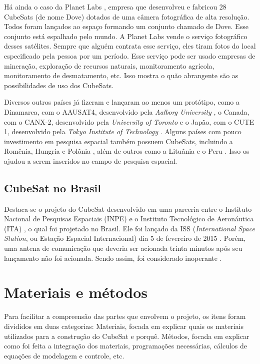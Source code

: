 \documentclass[
	12pt,				%
	openany,			%
	twoside,			%
	a4paper,			%
	english,			%
	french,				%
	spanish,			%
	brazil,				%
	oldfontcommands
	]{abntex2}
\begin{document}
Há ainda o caso da Planet Labs \cite{PlanetLabs}, empresa que desenvolveu e fabricou 28 CubeSats (de nome Dove) dotados de uma câmera fotográfica de alta resolução. Todos foram lançados ao espaço formando um conjunto chamado de Dove. Esse conjunto está espalhado pelo mundo. A Planet Labs vende o serviço fotográfico desses satélites. Sempre que alguém contrata esse serviço, eles tiram fotos do local especificado pela pessoa por um período. Esse serviço pode ser usado empresas de mineração, exploração de recursos naturais, monitoramento agrícola, monitoramento de desmatamento, etc. Isso mostra o quão abrangente são as possibilidades de uso dos CubeSats.

Diversos outros países já fizeram e lançaram ao menos um protótipo, como a Dinamarca, com o AAUSAT4, desenvolvido pela \textit{Aalborg University} \cite{AAUSAT}, o Canada, com o CANX-2, desenvolvido pela \textit{University of Toronto} \cite{CANX} e o Japão, com o CUTE 1, desenvolvido pela \textit{Tokyo Institute of Technology} \cite{CUTE}. Alguns países com pouco investimento em pesquisa espacial também possuem CubeSats, incluindo a Romênia, Hungria e Polônia \cite{ESA}, além de outros como a Lituânia e o Peru \cite{SpaceNews}. Isso os ajudou a serem inseridos no campo de pesquisa espacial.

\section[CubeSat no Brasil]{CubeSat no Brasil}

Destaca-se o projeto do CubeSat desenvolvido em uma parceria entre o Instituto Nacional de Pesquisas Espaciais (INPE) e o Instituto Tecnológico de Aeronáutica (ITA) \cite{AIT}, o qual foi projetado no Brasil. Ele foi lançado da ISS (\textit{International Space Station}, ou Estação Espacial Internacional) dia 5 de fevereiro de 2015 \cite{AEB}. Porém, uma antena de comunicação que deveria ser acionada trinta minutos após seu lançamento não foi acionada. Sendo assim, foi considerado inoperante \cite{ITA}.


\chapter[Materiais e Métodos]{Materiais e métodos}

Para facilitar a compreensão das partes que envolvem o projeto, os itens foram divididos em duas categorias:
Materiais, focada em explicar quais os materiais utilizados para a construção do CubeSat e porquê.
Métodos, focada em explicar como foi feita a integração dos materiais, programações necessárias, cálculos de equações de modelagem e controle, etc.
\end{document}
